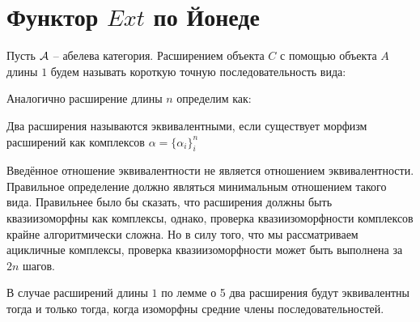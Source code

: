 \documentclass[../main.tex]{subfiles}
\begin{document}
\section{Функтор $Ext$ по Йонеде}
\begin{to_def}
Пусть $\mathcal{A}$ -- абелева категория. Расширением объекта $C$ с помощью объекта $A$ длины $1$ будем называть короткую точную последовательность вида:
\bee
{}
\eee
Аналогично расширение длины $n$ определим как:
\bee
{}
\eee
\end{to_def}
\begin{to_not_def}
Два расширения называются эквивалентными, если существует морфизм расширений как комплексов $\alpha = \{\alpha_i\}_i^{n}$
\bee
{}
\eee
\end{to_not_def}
\begin{to_com}
Введённое отношение эквивалентности не является отношением эквивалентности. Правильное определение должно являться минимальным отношением такого вида. Правильнее было бы сказать, что расширения должны быть квазиизоморфны как комплексы, однако, проверка квазиизоморфности комплексов крайне алгоритмически сложна. Но в силу того, что мы рассматриваем ацикличные комплексы, проверка квазиизоморфности может быть выполнена за $2n$ шагов.
\end{to_com}
В случае расширений длины $1$ по лемме о 5 два расширения будут эквивалентны тогда и только тогда, когда изоморфны средние члены последовательностей. 
\bee
{}
\end{document}
